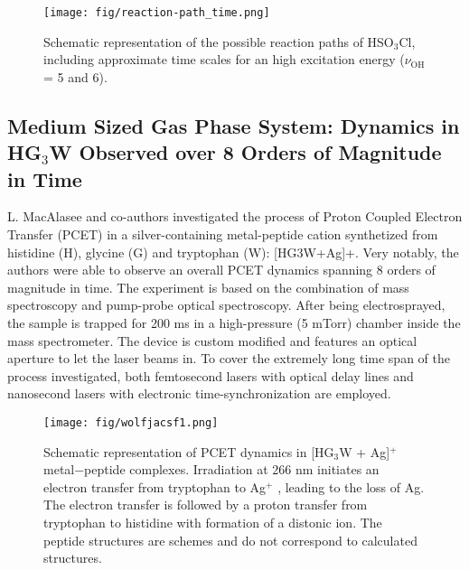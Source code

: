 \documentclass[journal=jacsat,manuscript=article]{achemso}
\begin{document}
\begin{figure}
\texttt{[image: fig/reaction-path\_time.png]}
\caption{Schematic representation of the possible reaction paths of
  HSO$_3$Cl, including approximate time scales for an high excitation
  energy ($\nu_{\text{OH}}$ = 5 and 6).}
\label{fig:vibphotodis}
\end{figure} 
    

\subsection{Medium Sized Gas Phase System: Dynamics in HG$_3$W Observed over 8 Orders of Magnitude in Time}
L. MacAlasee and co-authors investigated the process of Proton Coupled
Electron Transfer (PCET) in a silver-containing metal-peptide cation
synthetized from histidine (H), glycine (G) and tryptophan (W):
[HG3W+Ag]+. Very notably, the authors were able to observe an overall
PCET dynamics spanning 8 orders of magnitude in time.  The experiment
is based on the combination of mass spectroscopy and pump-probe
optical spectroscopy. After being electrosprayed, the sample is
trapped for 200 ms in a high-pressure (5 mTorr) chamber inside the
mass spectrometer. The device is custom modified and features an
optical aperture to let the laser beams in.  To cover the extremely
long time span of the process investigated, both femtosecond lasers
with optical delay lines and nanosecond lasers with electronic
time-synchronization are employed.



\begin{figure}[h]
\centering
\texttt{[image: fig/wolfjacsf1.png]}
\caption{Schematic representation of PCET dynamics in [HG$_3$W +
    Ag]$^+$ metal−peptide complexes. Irradiation at 266 nm initiates
  an electron transfer from tryptophan to Ag$^+$ , leading to the loss
  of Ag.  The electron transfer is followed by a proton transfer from
  tryptophan to histidine with formation of a distonic ion. The
  peptide structures are schemes and do not correspond to calculated
  structures.}
\label{fig:fig1jacs}
\end{figure}
\end{document}
